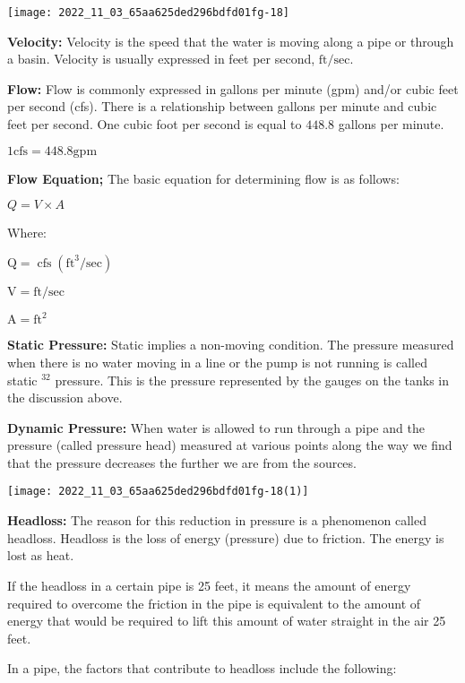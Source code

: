 \begin{center}
\texttt{[image: 2022\_11\_03\_65aa625ded296bdfd01fg-18]}
\end{center}

\textbf{Velocity: } Velocity is the speed that the water is moving along a pipe or through a basin. Velocity is usually expressed in feet per second, $\mathrm{ft} / \mathrm{sec}$.

\textbf{Flow: } Flow is commonly expressed in gallons per minute (gpm) and/or cubic feet per second (cfs). There is a relationship between gallons per minute and cubic feet per second. One cubic foot per second is equal to $448.8$ gallons per minute.

$1 \mathrm{cfs}=448.8 \mathrm{gpm}$

\textbf{Flow Equation; }
The basic equation for determining flow is as follows:

$Q=V \times A$

Where:

$\mathrm{Q}=\operatorname{cfs}\left(\mathrm{ft}^{3} / \mathrm{sec}\right)$

$\mathrm{V}=\mathrm{ft} / \mathrm{sec}$

$\mathrm{A}=\mathrm{ft}^{2}$

\textbf{Static Pressure: } Static implies a non-moving condition.  The pressure measured when there is no water moving in a line or the pump is not running is called static $^{32}$ pressure. This is the pressure represented by the gauges on the tanks in the discussion above.

\textbf{Dynamic Pressure: } When water is allowed to run through a pipe and the pressure (called pressure head) measured at various points along the way we find that the pressure decreases the further we are from the sources.
\begin{center}
\texttt{[image: 2022\_11\_03\_65aa625ded296bdfd01fg-18(1)]}
\end{center}
\textbf{Headloss: }  The reason for this reduction in pressure is a phenomenon called headloss. Headloss is the loss of energy (pressure) due to friction. The energy is lost as heat.

If the headloss in a certain pipe is 25 feet, it means the amount of energy required to overcome the friction in the pipe is equivalent to the amount of energy that would be required to lift this amount of water straight in the air 25 feet.

In a pipe, the factors that contribute to headloss include the following:

